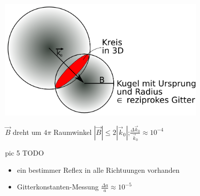 \begin{itemize}
\includegraphics[width=0.75\textwidth]{kap03_08.png}

\(\vec B\) dreht um \(4\pi\) Raumwinkel \(|\vec B| \leq 2|\vec k_0|\);\(\frac{\Delta \vec k_0}{ \vec k_0}\approx 10^{-4}\)

pic 5 TODO

\begin{itemize}
\item ein bestimmer Reflex in alle Richtuungen vorhanden
\item Gitterkonstanten-Messung \(\frac {\Delta a}{a}\approx 10^{-5}\)
\end{itemize}

\end{itemize}



